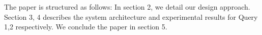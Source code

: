 
The paper is structured as follows: In section 2, we detail our design approach. Section 3, 4 describes the system architecture and experimental results for Query 1,2 respectively. We conclude the paper in section 5.
